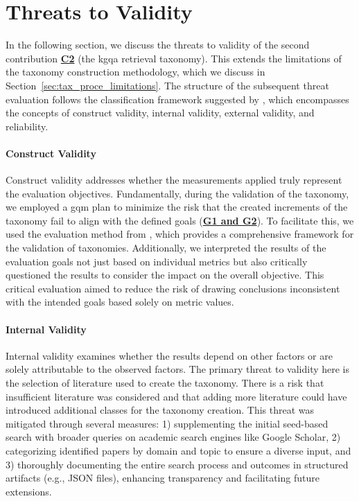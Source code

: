 
\section{Threats to Validity}
\label{sec:taxonomy_threats_to_validity}

In the following section, we discuss the threats to validity of the second contribution \hyperref[enum:c2]{\textbf{C2}} (the \gls{kgqa} retrieval taxonomy). This extends the limitations of the taxonomy construction methodology, which we discuss in Section~\ref{sec:tax_proce_limitations}. The structure of the subsequent threat evaluation follows the classification framework suggested by \textcite{runeson_guidelines_2009}, which encompasses the concepts of construct validity, internal validity, external validity, and reliability.

\paragraph{Construct Validity}
Construct validity addresses whether the measurements applied truly represent the evaluation objectives. Fundamentally, during the validation of the taxonomy, we employed a \gls{gqm} plan to minimize the risk that the created increments of the taxonomy fail to align with the defined goals (\hyperref[tab:gqm_taxonomy_validation]{\textbf{G1 and G2}}). To facilitate this, we used the evaluation method from \textcite{kaplan_introducing_2022}, which provides a comprehensive framework for the validation of taxonomies. Additionally, we interpreted the results of the evaluation goals not just based on individual metrics but also critically questioned the results to consider the impact on the overall objective. This critical evaluation aimed to reduce the risk of drawing conclusions inconsistent with the intended goals based solely on metric values.

\paragraph{Internal Validity}
Internal validity examines whether the results depend on other factors or are solely attributable to the observed factors. The primary threat to validity here is the selection of literature used to create the taxonomy. There is a risk that insufficient literature was considered and that adding more literature could have introduced additional classes for the taxonomy creation. This threat was mitigated through several measures: 1) supplementing the initial seed-based search with broader queries on academic search engines like Google Scholar, 2) categorizing identified papers by domain and topic to ensure a diverse input, and 3) thoroughly documenting the entire search process and outcomes in structured artifacts (e.g., JSON files), enhancing transparency and facilitating future extensions.

